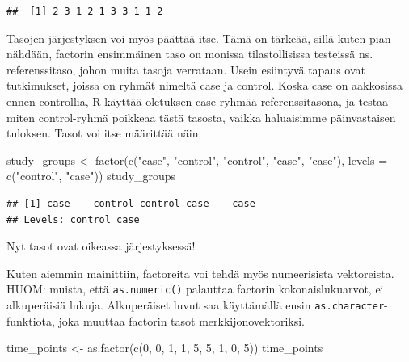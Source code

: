 \documentclass[
]{book}
\newenvironment{Shaded}{\begin{snugshade}}{\end{snugshade}}
\newcommand{\AttributeTok}[1]{\textcolor[rgb]{0.77,0.63,0.00}{#1}}
\newcommand{\DecValTok}[1]{\textcolor[rgb]{0.00,0.00,0.81}{#1}}
\newcommand{\FunctionTok}[1]{\textcolor[rgb]{0.00,0.00,0.00}{#1}}
\newcommand{\NormalTok}[1]{#1}
\newcommand{\OtherTok}[1]{\textcolor[rgb]{0.56,0.35,0.01}{#1}}
\newcommand{\StringTok}[1]{\textcolor[rgb]{0.31,0.60,0.02}{#1}}
\begin{document}
\begin{verbatim}
##  [1] 2 3 1 2 1 3 3 1 1 2
\end{verbatim}

Tasojen järjestyksen voi myös päättää itse. Tämä on tärkeää, sillä kuten pian nähdään, factorin ensimmäinen taso on monissa tilastollisissa testeissä ns. referenssitaso, johon muita tasoja verrataan. Usein esiintyvä tapaus ovat tutkimukset, joissa on ryhmät nimeltä case ja control. Koska case on aakkosissa ennen controllia, R käyttää oletuksen case-ryhmää referenssitasona, ja testaa miten control-ryhmä poikkeaa tästä tasosta, vaikka haluaisimme päinvastaisen tuloksen. Tasot voi itse määrittää näin:

\begin{Shaded}
\begin{Highlighting}[]
\NormalTok{study\_groups }\OtherTok{\textless{}{-}} \FunctionTok{factor}\NormalTok{(}\FunctionTok{c}\NormalTok{(}\StringTok{"case"}\NormalTok{, }\StringTok{"control"}\NormalTok{, }\StringTok{"control"}\NormalTok{, }\StringTok{"case"}\NormalTok{, }\StringTok{"case"}\NormalTok{),}
                       \AttributeTok{levels =} \FunctionTok{c}\NormalTok{(}\StringTok{"control"}\NormalTok{, }\StringTok{"case"}\NormalTok{))}
\NormalTok{study\_groups}
\end{Highlighting}
\end{Shaded}

\begin{verbatim}
## [1] case    control control case    case   
## Levels: control case
\end{verbatim}

Nyt tasot ovat oikeassa järjestyksessä!

Kuten aiemmin mainittiin, factoreita voi tehdä myös numeerisista vektoreista. HUOM: muista, että \texttt{as.numeric()} palauttaa factorin kokonaislukuarvot, ei alkuperäisiä lukuja. Alkuperäiset luvut saa käyttämällä ensin \texttt{as.character}-funktiota, joka muuttaa factorin tasot merkkijonovektoriksi.

\begin{Shaded}
\begin{Highlighting}[]
\NormalTok{time\_points }\OtherTok{\textless{}{-}} \FunctionTok{as.factor}\NormalTok{(}\FunctionTok{c}\NormalTok{(}\DecValTok{0}\NormalTok{, }\DecValTok{0}\NormalTok{, }\DecValTok{1}\NormalTok{, }\DecValTok{1}\NormalTok{, }\DecValTok{5}\NormalTok{, }\DecValTok{5}\NormalTok{, }\DecValTok{1}\NormalTok{, }\DecValTok{0}\NormalTok{, }\DecValTok{5}\NormalTok{))}
\NormalTok{time\_points}
\end{Highlighting}
\end{Shaded}
\end{document}
